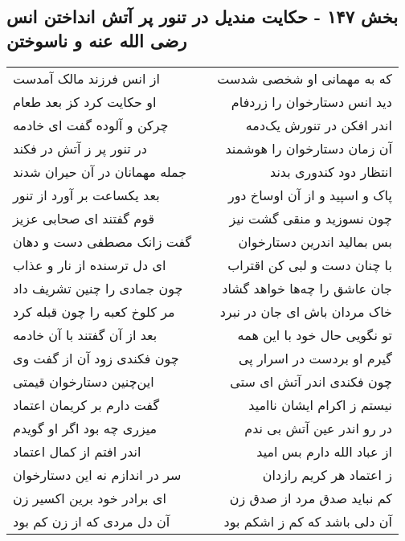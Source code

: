 \begin{center}
\section*{بخش ۱۴۷ - حکایت مندیل در تنور پر آتش انداختن  انس رضی الله عنه و ناسوختن}
\label{sec:sh147}
\begin{longtable}{l p{0.5cm} r}
از انس فرزند مالک آمدست
&&
که به مهمانی او شخصی شدست
\\
او حکایت کرد کز بعد طعام
&&
دید انس دستارخوان را زردفام
\\
چرکن و آلوده گفت ای خادمه
&&
اندر افکن در تنورش یک‌دمه
\\
در تنور پر ز آتش در فکند
&&
آن زمان دستارخوان را هوشمند
\\
جمله مهمانان در آن حیران شدند
&&
انتظار دود کندوری بدند
\\
بعد یکساعت بر آورد از تنور
&&
پاک و اسپید و از آن اوساخ دور
\\
قوم گفتند ای صحابی عزیز
&&
چون نسوزید و منقی گشت نیز
\\
گفت زانک مصطفی دست و دهان
&&
بس بمالید اندرین دستارخوان
\\
ای دل ترسنده از نار و عذاب
&&
با چنان دست و لبی کن اقتراب
\\
چون جمادی را چنین تشریف داد
&&
جان عاشق را چه‌ها خواهد گشاد
\\
مر کلوخ کعبه را چون قبله کرد
&&
خاک مردان باش ای جان در نبرد
\\
بعد از آن گفتند با آن خادمه
&&
تو نگویی حال خود با این همه
\\
چون فکندی زود آن از گفت وی
&&
گیرم او بردست در اسرار پی
\\
این‌چنین دستارخوان قیمتی
&&
چون فکندی اندر آتش ای ستی
\\
گفت دارم بر کریمان اعتماد
&&
نیستم ز اکرام ایشان ناامید
\\
میزری چه بود اگر او گویدم
&&
در رو اندر عین آتش بی ندم
\\
اندر افتم از کمال اعتماد
&&
از عباد الله دارم بس امید
\\
سر در اندازم نه این دستارخوان
&&
ز اعتماد هر کریم رازدان
\\
ای برادر خود برین اکسیر زن
&&
کم نباید صدق مرد از صدق زن
\\
آن دل مردی که از زن کم بود
&&
آن دلی باشد که کم ز اشکم بود
\\
\end{longtable}
\end{center}
